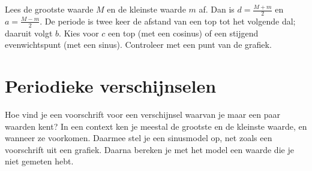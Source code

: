 \begin{werkwijze}
Lees de grootste waarde $M$ en de kleinste waarde $m$ af. Dan is $d = \frac{M + m}{2}$ en $a = \frac{M - m}{2}$. De periode is twee keer de afstand van een top tot het volgende dal; daaruit volgt $b$. Kies voor $c$ een top (met een cosinus) of een stijgend evenwichtspunt (met een sinus). Controleer met een punt van de grafiek.
\end{werkwijze}

\begin{oefeningen}

\end{oefeningen}

\section{Periodieke verschijnselen}

Hoe vind je een voorschrift voor een verschijnsel waarvan je maar een paar waarden kent? In een context ken je meestal de grootste en de kleinste waarde, en wanneer ze voorkomen. Daarmee stel je een sinusmodel op, net zoals een voorschrift uit een grafiek. Daarna bereken je met het model een waarde die je niet gemeten hebt.

